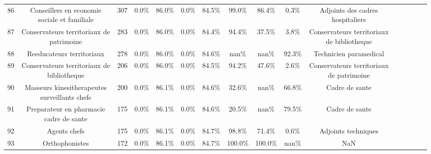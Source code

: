 \documentclass[10pt]{article}
\begin{document}
\begin{landscape}
\begin{longtable}{ | p{0.5cm} |*{15}{c|} }
86  &       Conseillers en economie sociale et familiale &            307 &           0.0\% &                  86.0\% &                 0.0\% &                    84.5\% &              99.0\% &                             86.4\% &                                     0.3\% &                   Adjoints des cadres hospitaliers \\
87  &           Conservateurs territoriaux de patrimoine &            283 &           0.0\% &                  86.0\% &                 0.0\% &                    84.4\% &              94.4\% &                             37.5\% &                                     3.8\% &         Conservateurs territoriaux de bibliotheque \\
88  &                          Reeducateurs territoriaux &            278 &           0.0\% &                  86.0\% &                 0.0\% &                    84.6\% &               nan\% &                              nan\% &                                    92.3\% &                             Technicien paramedical \\
89  &         Conservateurs territoriaux de bibliotheque &            206 &           0.0\% &                  86.0\% &                 0.0\% &                    84.5\% &              94.2\% &                             47.6\% &                                     2.6\% &           Conservateurs territoriaux de patrimoine \\
90  &      Masseurs kinesitherapeutes surveillants chefs &            200 &           0.0\% &                  86.1\% &                 0.0\% &                    84.6\% &              32.6\% &                              nan\% &                                    66.8\% &                                     Cadre de sante \\
91  &            Preparateur en pharmacie cadre de sante &            175 &           0.0\% &                  86.1\% &                 0.0\% &                    84.6\% &              20.5\% &                              nan\% &                                    79.5\% &                                     Cadre de sante \\
92  &                                       Agents chefs &            175 &           0.0\% &                  86.1\% &                 0.0\% &                    84.7\% &              98.8\% &                             71.4\% &                                     0.6\% &                                Adjoints techniques \\
93  &                                     Orthophonistes &            172 &           0.0\% &                  86.1\% &                 0.0\% &                    84.7\% &             100.0\% &                            100.0\% &                                     nan\% &                                                NaN \\

\end{longtable}
\end{landscape}
\end{document}
